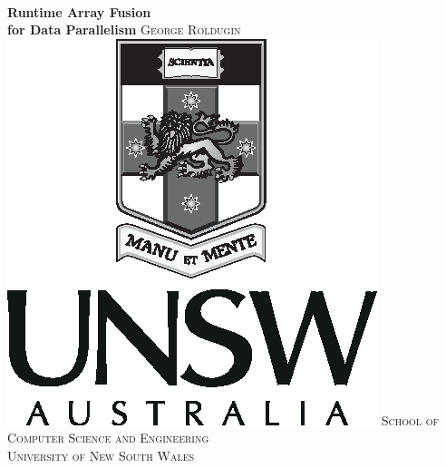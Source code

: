 \documentclass[preamble.tex]{subfiles}
\begin{document}
\begin{titlepage}
    \centering
    ~\\
    \vskip3cm
    \Huge\textbf{Runtime Array Fusion\\for Data Parallelism} 
    \vskip2cm
    \Large\textsc{George Roldugin}
    \vfill
    \vfill
    \includegraphics[]{img/UNSW-PortraitGreyscale-Black}
    \vfill
    \Large\textsc{
        School of Computer Science and Engineering\\
        University of New South Wales
    }
    \vfill
    \vfill
\end{titlepage}

\end{document}
